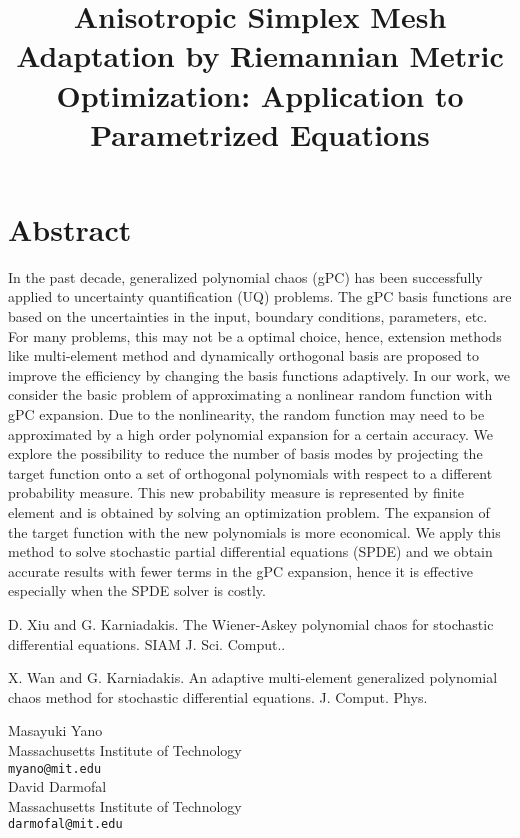 \documentclass[article,A4,11pt]{llncs}%
\begin{document}
\section*{Abstract}
In the past decade, generalized polynomial chaos (gPC) has been successfully applied to uncertainty quantification (UQ) problems. The gPC basis functions are based on the uncertainties in the input, boundary conditions, parameters, etc. For many problems, this may not be a optimal choice, hence, extension methods like multi-element method and dynamically orthogonal basis are proposed to improve the efficiency by changing the basis functions adaptively. In our work, we consider the basic problem of approximating a nonlinear random function with gPC expansion. Due to the nonlinearity, the random function may need to be approximated by a high order polynomial expansion for a certain accuracy. We explore the possibility to reduce the number of basis modes by projecting the target function onto a set of orthogonal polynomials with respect to a different probability measure. This new probability measure is represented by finite element and is obtained by solving an optimization problem. The expansion of the target function with the new polynomials is more economical. We apply this method to solve stochastic partial differential equations (SPDE) and we obtain accurate results with fewer terms in the gPC expansion, hence it is effective especially when the SPDE solver is costly.


\begin{thebibliography}{10}
{\sc D. Xiu and G. Karniadakis}. {The Wiener-Askey polynomial chaos for stochastic differential equations}. SIAM J. Sci. Comput..

{\sc X. Wan and G. Karniadakis}. {An adaptive multi-element generalized polynomial chaos method for stochastic differential equations}. J. Comput. Phys.
\end{thebibliography}

\title{Anisotropic Simplex Mesh Adaptation by Riemannian Metric Optimization: Application to Parametrized Equations}
 \author{} \institute{}
\maketitle
\begin{center}
{\large Masayuki  Yano}\\
Massachusetts Institute of Technology\\
{\tt myano@mit.edu}
\\ \vspace{4mm}
{\large David Darmofal}\\
Massachusetts Institute of Technology\\
{\tt darmofal@mit.edu}
\end{center}
\end{document}
